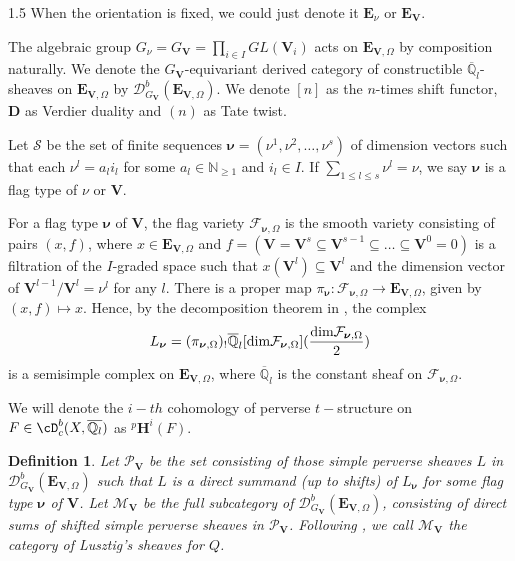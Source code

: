 \documentclass[10pt]{amsart}
\newtheorem{definition}[theorem]{Definition}
\def\dim{\mbox{\rm dim}}   \def\End{\mbox{\rm End}}
\def\bfV{{\mathbf V}}
\def\bfV{\mathbf{V}}
\def\bfE{\mathbf{E}}
\newcommand\bbq{{\mathbb Q}}
\begin{document}
\begin{spacing}{1.5}
When the orientation is fixed, we could just denote it $\bfE_{\nu}$ or $\bfE_{\bfV}$.

The algebraic group $G_{\nu}=G_{\mathbf{V}} = \prod_{i \in I} GL(\mathbf{V}_i)$ acts on $\mathbf{E}_{\mathbf{V}, \Omega}$ by composition naturally. We denote the $G_{\mathbf{V}}$-equivariant derived category of constructible $\overline{\mathbb{Q}}_l$-sheaves on $\mathbf{E}_{\mathbf{V}, \Omega}$ by $\mathcal{D}^b_{G_{\mathbf{V}}}(\mathbf{E}_{\mathbf{V}, \Omega})$. We denote $[n]$ as the $n$-times shift functor, $\mathbf{D}$ as Verdier duality and $(n)$ as Tate twist.

Let $\mathcal{S}$ be the set of finite sequences $\boldsymbol{\nu} = (\nu^1, \nu^2, \dots, \nu^s)$ of dimension vectors such that each $\nu^l = a_l i_l$ for some $a_l \in \mathbb{N}_{\geqslant 1}$ and $i_l \in I$. If $\sum_{1 \leqslant l \leqslant s} \nu^l = \nu$, we say $\boldsymbol{\nu}$ is a flag type of $\nu$ or $\mathbf{V}$.

For a flag type $\boldsymbol{\nu}$ of $\mathbf{V}$, the flag variety $\mathcal{F}_{\boldsymbol{\nu}, \Omega}$ is the smooth variety consisting of pairs $(x, f)$, where $x \in \mathbf{E}_{\mathbf{V}, \Omega}$ and $f = (\mathbf{V} = \mathbf{V}^s \subseteq \mathbf{V}^{s-1} \subseteq \dots \subseteq \mathbf{V}^0 = 0)$ is a filtration of the $I$-graded space such that $x(\mathbf{V}^l) \subseteq \mathbf{V}^l$ and the dimension vector of $\mathbf{V}^{l-1} / \mathbf{V}^l = \nu^l$ for any $l$. There is a proper map $\pi_{\boldsymbol{\nu}}: \mathcal{F}_{\boldsymbol{\nu}, \Omega} \to \mathbf{E}_{\mathbf{V}, \Omega}$, given by $(x, f) \mapsto x$. Hence, by the decomposition theorem in \cite{BBD}, the complex
$$
L_{\boldsymbol{\nu}} = (\pi_{\boldsymbol{\nu}, \Omega})_! \overline{\mathbb{Q}}_l[\dim \mathcal{F}_{\boldsymbol{\nu}, \Omega}](\frac{\dim \mathcal{F}_{\boldsymbol{\nu}, \Omega}}{2})
$$
is a semisimple complex on $\mathbf{E}_{\mathbf{V}, \Omega}$, where $\overline{\mathbb{Q}}_l$ is the constant sheaf on $\mathcal{F}_{\boldsymbol{\nu}, \Omega}$.

We will denote the $i-th$ cohomology of perverse $t-$structure on $F\in \cD_c^b(X,\overline{\bbq_l})$ as $ ^p\mathbf{H}^i(F).$
\begin{definition}
    Let $\mathcal{P}_{\mathbf{V}}$ be the set consisting of those simple perverse sheaves $L$ in $\mathcal{D}^b_{G_{\mathbf{V}}}(\mathbf{E}_{\mathbf{V}, \Omega})$ such that $L$ is a direct summand (up to shifts) of $L_{\boldsymbol{\nu}}$ for some flag type $\boldsymbol{\nu}$ of $\mathbf{V}$. Let $\mathcal{M}_{\mathbf{V}}$ be the full subcategory of $\mathcal{D}^b_{G_{\mathbf{V}}}(\mathbf{E}_{\mathbf{V}, \Omega})$, consisting of direct sums of shifted simple perverse sheaves in $\mathcal{P}_{\mathbf{V}}$. Following \cite{OSNotes}, we call $\mathcal{M}_{\mathbf{V}}$ the category of Lusztig's sheaves for $Q$.
\end{definition}


\end{spacing}
\end{document}
